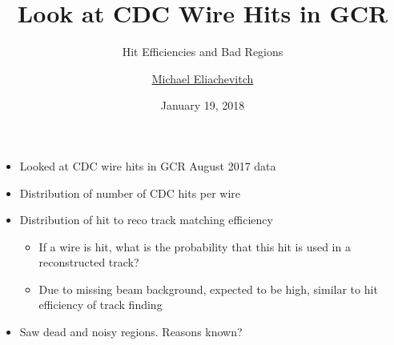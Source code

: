 \documentclass[18pt]{beamer}
\title{Look at CDC Wire Hits in GCR}
\subtitle{Hit Efficiencies and Bad Regions}
\author{\underline{Michael Eliachevitch}}
\date{January 19, 2018}
\institute{ETP -- KIT}
\begin{document}

\begin{frame}
  \addtocounter{framenumber}{-1}
  \titlepage
\end{frame}

\begin{frame}
  \begin{itemize}
  \item Looked at CDC wire hits in GCR August 2017 data
  \item Distribution of number of CDC hits per wire
  \item Distribution of hit to reco track matching efficiency
    \begin{itemize}
    \item If a wire is hit, what is the probability that this hit is used in a reconstructed track?\\
    \item Due to missing beam background, expected to be high, similar to hit efficiency of track finding
    \end{itemize}
  \item Saw dead and noisy regions. Reasons known?
  \end{itemize}
\end{frame}
\end{document}
